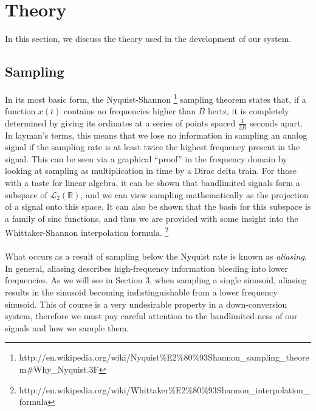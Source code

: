 \documentclass[11pt]{article}
\begin{document}
\section{Theory}
In this section, we discuss the theory used in the development of our system.

    \subsection{Sampling}
    In its most basic form, the Nyquist-Shannon \footnote{http://en.wikipedia.org/wiki/Nyquist\%E2\%80\%93Shannon\_sampling\_theorem\#Why\_Nyquist.3F} sampling theorem states that, if a function $x(t)$ contains no frequencies higher than $B$ hertz, it is completely determined by giving its ordinates at a series of points spaced $\frac{1}{2B}$ seconds apart. In layman's terms, this means that we lose no information in sampling an analog signal if the sampling rate is at least twice the highest frequency present in the signal. This can be seen via a graphical ``proof'' in the frequency domain by looking at sampling as multiplication in time by a Dirac delta train. For those with a taste for linear algebra, it can be shown that bandlimited signals form a subspace of $\mathscr{L}_2(\mathbb{R})$, and we can view sampling mathematically as the projection of a signal onto this space. It can also be shown that the basis for this subspace is a family of sinc functions, and thus we are provided with some insight into the Whittaker-Shannon interpolation formula. \footnote{http://en.wikipedia.org/wiki/Whittaker\%E2\%80\%93Shannon\_interpolation\_formula}
    \\
    \\
    \noindent What occurs as a result of sampling below the Nyquist rate is known as \emph{aliasing}. In general, aliasing describes high-frequency information bleeding into lower frequencies. As we will see in Section 3, when sampling a single sinusoid, aliasing results in the sinusoid becoming indistinguishable from a lower frequency sinusoid. This of course is a very undesirable property in a down-conversion system, therefore we must pay careful attention to the bandlimited-ness of our signals and how we sample them.
\end{document}
